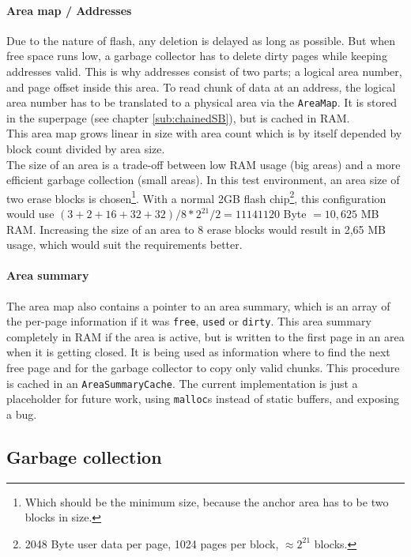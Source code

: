 \paragraph{Area map / Addresses}
Due to the nature of flash, any deletion is delayed as long as possible. But when free space runs low, a garbage collector has to delete dirty pages while keeping addresses valid. This is why addresses consist of two parts; a logical area number, and page offset inside this area. To read chunk of data at an address, the logical area number has to be translated to a physical area via the \texttt{AreaMap}. It is stored in the superpage (see chapter \ref{sub:chainedSB}), but is cached in RAM.\\
This area map grows linear in size with area count which is by itself depended by block count divided by area size.\\
The size of an area is a trade-off between low RAM usage (big areas) and a more efficient garbage collection (small areas). In this test environment, an area size of two erase blocks is chosen\footnote{Which should be the minimum size, because the anchor area has to be two blocks in size.}. With a normal 2GB flash chip\footnote{2048 Byte user data per page, 1024 pages per block, $\approx 2^21$ blocks.}, this configuration would use $(3+2+16+32+32) / 8 * 2^{21} / 2 = 11141120$ Byte $= 10,625$ MB RAM. Increasing the size of an area to 8 erase blocks would result in 2,65 MB usage, which would suit the requirements better.

\paragraph{Area summary}
The area map also contains a pointer to an area summary, which is an array of the per-page information if it was \texttt{free}, \texttt{used} or \texttt{dirty}. This area summary completely in RAM if the area is active, but is written to the first page in an area when it is getting closed. It is being used as information where to find the next free page and for the garbage collector to copy only valid chunks. This procedure is cached in an \texttt{AreaSummaryCache}. The current implementation is just a placeholder for future work, using \texttt{malloc}s instead of static buffers, and exposing a bug.

\subsection{Garbage collection}
